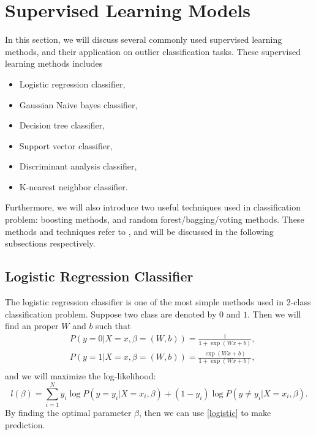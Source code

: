 \documentclass[english]{article}
\begin{document}
\section{Supervised Learning Models}
\par In this section, we will discuss several commonly used supervised learning methods, and their application on outlier classification tasks. These supervised learning methods includes
\begin{itemize}
	\item Logistic regression classifier,
	\item Gaussian Naive bayes classifier,
	\item Decision tree classifier,
	\item Support vector classifier,
	\item Discriminant analysis classifier,
	\item K-nearest neighbor classifier.
\end{itemize}
\par Furthermore, we will also introduce two useful techniques used in classification problem: boosting methods, and random forest/bagging/voting methods. These methods and techniques refer to \cite{scikit-learn}\cite{friedman2001elements}, and will be discussed in the following subsections respectively.

\subsection{Logistic Regression Classifier}
\par The logistic regression classifier is one of the most simple methods used in 2-class classification problem. Suppose two class are denoted by $0$ and $1$. Then we will find an proper $W$ and $b$ such that
\begin{equation}\label{logistic}
	\begin{aligned}
		&P(y=0|X=x, \beta=(W, b)) = \frac{1}{1 + \exp(Wx+b)},\\
		&P(y=1|X=x, \beta=(W, b)) = \frac{\exp(Wx+b)}{1 + \exp(Wx+b)},\\
	\end{aligned}
\end{equation}
and we will maximize the log-likelihood:
\begin{equation}
	l(\beta) = \sum_{i=1}^{N}y_{i}\log P(y=y_{i}|X=x_{i}, \beta) + (1-y_{i})\log P(y\neq y_{i}|X=x_{i}, \beta).
\end{equation}
By finding the optimal parameter $\beta$, then we can use \eqref{logistic} to make prediction.
\end{document}
